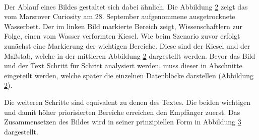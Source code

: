 \begin{figure}[H]
	\centering
	\hfill
	\\
	\label{fig:marsWaterResidue}
\end{figure}

Der Ablauf eines Bildes gestaltet sich dabei ähnlich. Die Abbildung
\ref{fig:marsWaterResidue} zeigt das vom Marsrover \glqq Curiosity \grqq
am $28.$ September aufgenommene ausgetrocknete Wasserbett. Der im linken
Bild markierte Bereich zeigt, Wissenschaftlern zur Folge, einen vom Wasser
verformten Kiesel. Wie beim Szenario zuvor erfolgt zunächst eine Markierung der wichtigen
Bereiche. Diese sind der Kiesel und der Maßstab, welche in der mittleren
Abbildung \ref{fig:marsWaterResidue} dargestellt werden. Bevor das Bild und
der Text Schritt für Schritt analysiert werden, muss dieser in Abschnitte eingeteilt werden,
welche später die einzelnen Datenblöcke darstellen (Abbildung \ref{fig:marsWaterResidue}).
 
\begin{figure}[H]
	\centering
	\hfill
	\hfill
	\label{fig:marsWaterResidue}
\end{figure}

Die weiteren Schritte sind equivalent zu denen des Textes. Die beiden wichtigen
und damit höher priorisierten Bereiche erreichen den Empfänger zuerst.
Das Zusammensetzen des Bildes wird in seiner prinzipiellen Form in
Abbildung \ref{fig:marsWaterResidueEmpfaenger} dargestellt.

\begin{figure}[H]
	\centering
	\hfill
	\hfill
	\label{fig:marsWaterResidueEmpfaenger}
\end{figure}
